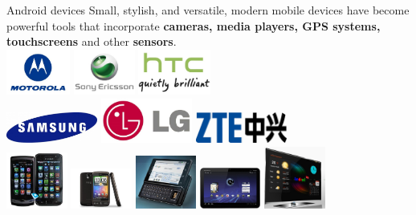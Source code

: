 \begin{frame}{Android devices}
Small, stylish, and versatile, modern mobile
devices have become powerful tools that
incorporate \textbf{cameras, media players, GPS
systems, touchscreens} and other \textbf{sensors}.\\
\includegraphics[height=1.5cm]{images/motorola}\hfill
\includegraphics[height=1.5cm]{images/se}\hfill
\includegraphics[height=1.5cm]{images/htc}\\
\includegraphics[width=3cm]{images/samsung}\hfill
\includegraphics[width=3cm]{images/lg}\hfill
\includegraphics[width=3cm]{images/zte}\\
\includegraphics[width=2cm]{images/phone}\hfill
\includegraphics[width=2cm]{images/phone1}\hfill
\includegraphics[width=2cm]{images/slide}\hfill
\includegraphics[width=2cm]{images/tablet}\hfill
\includegraphics[width=2cm]{images/tv}
\end{frame}

